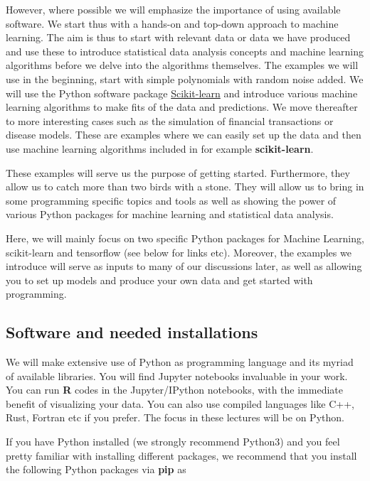 \documentclass[%
oneside,                 %
final,                   %
10pt]{article}
\begin{document}
However, where possible we will emphasize the
importance of using available software. We start thus with a hands-on
and top-down approach to machine learning. The aim is thus to start with
relevant data or data we have produced 
and use these to introduce statistical data analysis
concepts and machine learning algorithms before we delve into the
algorithms themselves. The examples we will use in the beginning, start with simple
polynomials with random noise added. We will use the Python
software package \href{{http://scikit-learn.org/stable/}}{Scikit-learn} and
introduce various machine learning algorithms to make fits of
the data and predictions. We move thereafter to more interesting
cases such as the simulation of financial transactions or disease
models. These are examples where we can easily set up the data and
then use machine learning algorithms included in for example
\textbf{scikit-learn}. 

These examples will serve us the purpose of getting
started. Furthermore, they allow us to catch more than two birds with
a stone. They will allow us to bring in some programming specific
topics and tools as well as showing the power of various Python 
packages for machine learning and statistical data analysis.  

Here, we will mainly focus on two
specific Python packages for Machine Learning, scikit-learn and
tensorflow (see below for links etc).  Moreover, the examples we
introduce will serve as inputs to many of our discussions later, as
well as allowing you to set up models and produce your own data and
get started with programming.





\subsection{Software and needed installations}

We will make extensive use of Python as programming language and its
myriad of available libraries.  You will find
Jupyter notebooks invaluable in your work.  You can run \textbf{R}
codes in the Jupyter/IPython notebooks, with the immediate benefit of
visualizing your data. You can also use compiled languages like C++,
Rust, Fortran etc if you prefer. The focus in these lectures will be
on Python.


If you have Python installed (we strongly recommend Python3) and you feel
pretty familiar with installing different packages, we recommend that
you install the following Python packages via \textbf{pip} as 
\end{document}
